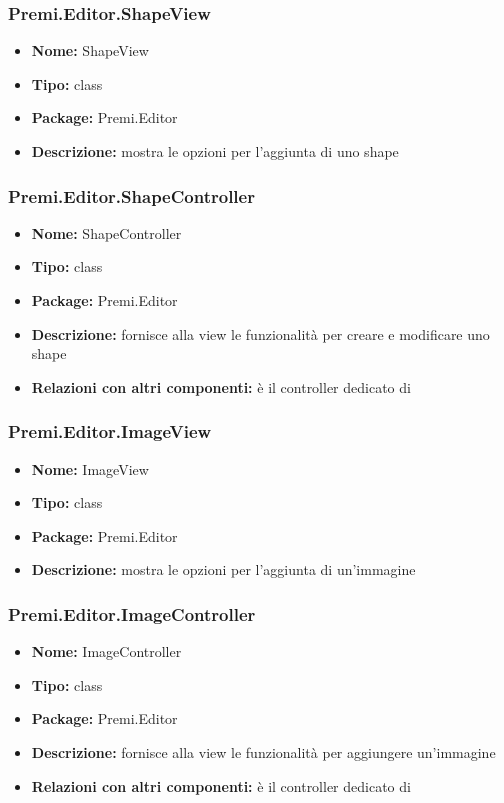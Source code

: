 \subsubsection{Premi.Editor.ShapeView}
\begin{itemize}
  \item \textbf{Nome:} ShapeView
  \item \textbf{Tipo:} class
  \item \textbf{Package:} Premi.Editor
  \item \textbf{Descrizione:} mostra le opzioni per l'aggiunta di uno shape
\end{itemize}
\subsubsection{Premi.Editor.ShapeController}
\begin{itemize}
  \item \textbf{Nome:} ShapeController
  \item \textbf{Tipo:} class
  \item \textbf{Package:} Premi.Editor
  \item \textbf{Descrizione:} fornisce alla view le funzionalità per creare e modificare uno shape
  \item \textbf{Relazioni con altri componenti:} è il controller dedicato di  
\end{itemize}
\subsubsection{Premi.Editor.ImageView}
\begin{itemize}
  \item \textbf{Nome:} ImageView
  \item \textbf{Tipo:} class
  \item \textbf{Package:} Premi.Editor
  \item \textbf{Descrizione:} mostra le opzioni per l'aggiunta di un'immagine
\end{itemize}
\subsubsection{Premi.Editor.ImageController}
\begin{itemize}
  \item \textbf{Nome:} ImageController
  \item \textbf{Tipo:} class
  \item \textbf{Package:} Premi.Editor
  \item \textbf{Descrizione:} fornisce alla view le funzionalità per aggiungere un'immagine
  \item \textbf{Relazioni con altri componenti:} è il controller dedicato di  
\end{itemize}

